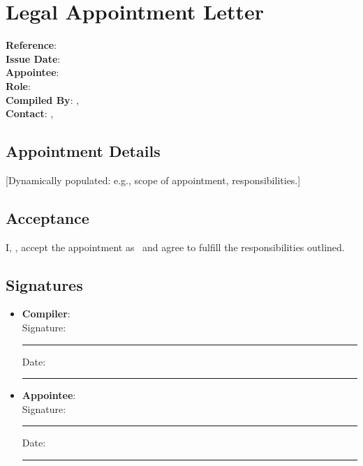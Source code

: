 \documentclass[11pt]{article}
\newcommand{\docTitle}{Legal Appointment Letter}
\newcommand{\refNumber}{}
\newcommand{\issueDate}{}
\newcommand{\appointeeName}{}
\newcommand{\appointeeRole}{}
\newcommand{\compilerName}{}
\newcommand{\compilerRole}{}
\newcommand{\compilerEmail}{}
\newcommand{\compilerPhone}{}
\begin{document}
\section*{\docTitle}
\textbf{Reference}: \refNumber \\
\textbf{Issue Date}: \issueDate \\
\textbf{Appointee}: \appointeeName \\
\textbf{Role}: \appointeeRole \\
\textbf{Compiled By}: \compilerName, \compilerRole \\
\textbf{Contact}: \compilerEmail, \compilerPhone

\subsection*{Appointment Details}
[Dynamically populated: e.g., scope of appointment, responsibilities.]

\subsection*{Acceptance}
I, \appointeeName, accept the appointment as \appointeeRole\ and agree to fulfill the responsibilities outlined.

\subsection*{Signatures}
\begin{itemize}
  \item \textbf{Compiler}: \compilerName \\
    Signature: \rule{5cm}{0.4pt} \quad Date: \rule{3cm}{0.4pt}
  \item \textbf{Appointee}: \appointeeName \\
    Signature: \rule{5cm}{0.4pt} \quad Date: \rule{3cm}{0.4pt}
\end{itemize}
\end{document}
